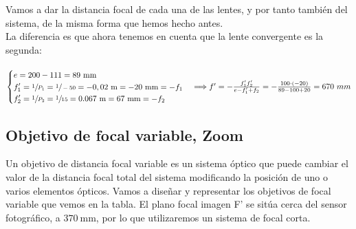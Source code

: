 \documentclass[11pt]{article}
\begin{document}
    \noindent Vamos a dar la distancia focal de cada una de las lentes, y por tanto también del sistema, de la misma forma que hemos hecho antes.\\
    
    La diferencia es que ahora tenemos en cuenta que la lente convergente es la segunda:\\ 
    \hspace{0cm}\\
    
    $\begin{cases}
        \begin{aligned}
            &e = 200 - 111 = 89\text{ mm}\\
            &f'_1 = \sfrac{1}{P_1} = \sfrac{1}{-50} = -0,02\text{ m} = -20\text{ mm} = -f_1\\
            &f'_2 = \sfrac{1}{P_2} = \sfrac{1}{15} = 0.067\text{ m} = 67\text{ mm} = -f_2
        \end{aligned}
    \end{cases}
    \Longrightarrow f' = -\frac{f'_1f'_2}{e-f'_1+f_2} = -\frac{100\cdot (-20)}{89-100+20} = 670\ mm$
    \\ 

    \clearpage
    \subsection{Objetivo de focal variable, Zoom}
            \noindent Un objetivo de distancia focal variable es un sistema óptico que puede cambiar el valor de la distancia focal total del sistema modificando la posición de uno o varios elementos ópticos. Vamos a diseñar y representar los objetivos de focal variable que vemos en la tabla. El plano focal imagen F' se sitúa cerca del sensor fotográfico, a $370\ $mm, por lo que utilizaremos un sistema de focal corta.
\end{document}
